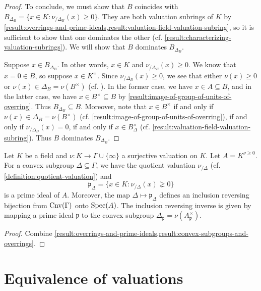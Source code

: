 \begin{proof}
To conclude, we must show that $B$ coincides with $B_{\Delta_B} = \{ x \in K : \nu_{/\Delta_B}(x) \geq  0 \}$. They are both valuation subrings of $K$ by  \cref{result:overrings-and-prime-ideals,result:valuation-field-valuation-subring}, so it is sufficient to show that one dominates the other (cf. \cref{result:characterizing-valuation-subrings}). We will show that $B$ dominates $B_{\Delta_B}$. 

Suppose $x \in B_{\Delta_B}$. In other words, $x \in K$ and $\nu_{/\Delta_B}(x) \geq 0$. We know that $x = 0 \in B$, so suppose $x \in K^\times$. Since $\nu_{/\Delta_B}(x) \geq 0$, we see that either $\nu(x) \geq 0$ or $\nu(x) \in \Delta_B = \nu(B^\times)$ (cf. ). In the former case, we have $x \in A \subseteq B$, and in the latter case, we have $x \in B^\times \subseteq B$ by \cref{result:image-of-group-of-units-of-overring}. Thus $B_{\Delta_B} \subseteq B$. Moreover, note that $x \in B^\times$ if and only if $\nu(x) \in \Delta_B = \nu(B^\times)$ (cf. \cref{result:image-of-group-of-units-of-overring}), if and only if $\nu_{/\Delta_B}(x) = 0$, if and only if $x \in B_{\Delta}^\times$ (cf. \cref{result:valuation-field-valuation-subring}). Thus $B$ dominates $B_{\Delta_B}$. 
\end{proof}

\begin{lemma}
Let $K$ be a field and $\nu : K \to \Gamma \cup \{\infty\}$ a surjective valuation on $K$. Let $A = K^{\nu \geq 0}$. For a convex subgroup $\Delta \subseteq \Gamma$, we have the quotient valuation $\nu_{/\Delta}$ (cf. \cref{definition:quotient-valuation}) and
\[ \mathfrak{p}_\Delta = \{ x \in K : \nu_{/\Delta}(x) \gneq 0 \} \]
is a prime ideal of $A$. Moreover, the map $\Delta \mapsto \mathfrak{p}_\Delta$ defines an inclusion reversing bijection from $\operatorname{Cnv}(\Gamma)$ onto $\operatorname{Spec}(A)$. The inclusion reversing inverse is given by mapping a prime ideal $\mathfrak{p}$ to the convex subgroup $\Delta_{\mathfrak{p}} = \nu(A_{\mathfrak{p}}^\times)$.
\end{lemma}

\begin{proof}
Combine \cref{result:overrings-and-prime-ideals,result:convex-subgroups-and-overrings}.
\end{proof}

\section{Equivalence of valuations}

